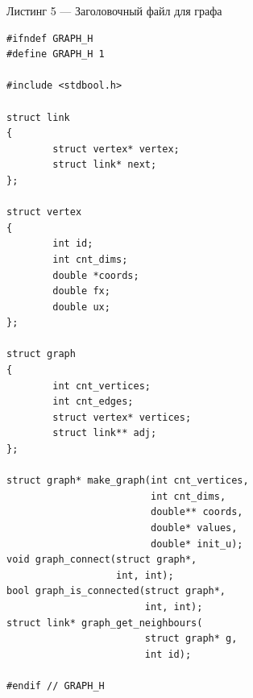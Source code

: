 \vspace{1em}
Листинг 5 --- Заголовочный файл для графа
\normalsize
\begin{verbatim}
#ifndef GRAPH_H
#define GRAPH_H 1

#include <stdbool.h>

struct link
{
        struct vertex* vertex;
        struct link* next;
};

struct vertex
{
        int id;
        int cnt_dims;
        double *coords;
        double fx;
        double ux;
};

struct graph
{
        int cnt_vertices;
        int cnt_edges;
        struct vertex* vertices;
        struct link** adj;
};

struct graph* make_graph(int cnt_vertices, 
                         int cnt_dims,
                         double** coords, 
                         double* values,
                         double* init_u);
void graph_connect(struct graph*, 
                   int, int);
bool graph_is_connected(struct graph*, 
                        int, int);
struct link* graph_get_neighbours(
                        struct graph* g, 
                        int id);

#endif // GRAPH_H

\end{verbatim}
\large


